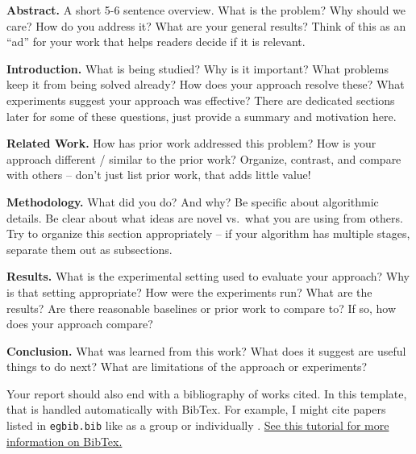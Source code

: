\documentclass[10pt,twocolumn,letterpaper]{article}
\begin{document}
\begin{compactenum}[1)]
    \item \textbf{Abstract.} A short 5-6 sentence overview. What is the problem? Why should we care? How do you address it? What are your general results? Think of this as an ``ad'' for your work that helps readers decide if it is relevant.\\
    
    \item \textbf{Introduction.} What is being studied? Why is it important? What problems keep it from being solved already? How does your approach resolve these? What experiments suggest your approach was effective? There are dedicated sections later for some of these questions, just    provide a summary and motivation here. \\
    
    \item \textbf{Related Work.} How has prior work addressed this problem? How is your approach different / similar to the prior work? Organize, contrast, and compare with others -- don't just list prior work, that adds little value! \\
    
    \item \textbf{Methodology.} What did you do? And why? Be specific about algorithmic details. Be clear about what ideas are novel vs.~what you are using from others. Try to organize this section appropriately -- if your algorithm has multiple stages, separate them out as subsections.  \\
    
    \item \textbf{Results.} What is the experimental setting used to evaluate your approach? Why is that setting appropriate? How were the experiments run? What are the results? Are there reasonable baselines or prior work to compare to? If so, how does your approach compare? \\
    
    \item \textbf{Conclusion.} What was learned from this work? What does it suggest are useful things to do next? What are limitations of the approach or experiments?\\
\end{compactenum}

\noindent Your report should also end with a bibliography of works cited.  In this template, that is handled automatically with BibTex. For example, I might cite papers listed in \texttt{egbib.bib} like \cite{Alpher04, Alpher02, ALpher03} as a group or individually \cite{Alpher05}. \href{https://www.overleaf.com/learn/latex/Bibliography_management_with_bibtex}{See this tutorial for more information on BibTex.}
\end{document}
